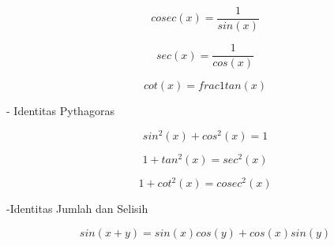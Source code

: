 \documentclass[a4paper,10pt]{article}
\begin{document}
\begin{eulernotebook}
\begin{eulercomment}
\begin{eulercomment}
\begin{eulercomment}
\begin{eulercomment}
\begin{eulercomment}
\begin{eulercomment}
\begin{eulercomment}
\begin{eulercomment}
\begin{eulercomment}
\begin{eulercomment}
\begin{eulercomment}
\begin{eulercomment}
\begin{eulercomment}
\begin{eulercomment}
\begin{eulercomment}
\begin{eulercomment}
\begin{eulercomment}
\begin{eulercomment}
\begin{eulercomment}
\begin{eulercomment}
\begin{eulercomment}
\begin{eulercomment}
\begin{eulercomment}
\begin{eulercomment}
\begin{eulercomment}
\begin{eulercomment}
\begin{eulercomment}
\begin{eulercomment}
\begin{eulercomment}
\begin{eulercomment}
\begin{eulercomment}
\begin{eulercomment}
\begin{eulercomment}
\begin{eulercomment}
\begin{eulercomment}
\begin{eulercomment}
\begin{eulercomment}
\begin{eulercomment}
\begin{eulercomment}
\begin{eulercomment}
\begin{eulercomment}
\begin{eulercomment}
\begin{eulercomment}
\begin{eulercomment}
\begin{eulercomment}
\begin{eulercomment}
\begin{eulercomment}
\begin{eulercomment}
\begin{eulerformula}
\[
cosec (x) =\frac {1}{sin (x)}
\]
\end{eulerformula}
\begin{eulerformula}
\[
sec (x)=\frac{1}{cos (x)}
\]
\end{eulerformula}
\begin{eulerformula}
\[
cot (x)=frac{1}{tan (x)}
\]
\end{eulerformula}
\begin{eulercomment}
- Identitas Pythagoras\\
\end{eulercomment}
\begin{eulerformula}
\[
sin^2 (x)+cos^2(x)=1
\]
\end{eulerformula}
\begin{eulerformula}
\[
1+tan^2(x)=sec^2(x)
\]
\end{eulerformula}
\begin{eulerformula}
\[
1+cot^2(x)=cosec^2(x)
\]
\end{eulerformula}
\begin{eulercomment}
-Identitas Jumlah dan Selisih\\
\end{eulercomment}
\begin{eulerformula}
\[
sin(x+y) = sin(x)cos(y) + cos(x)sin(y)
\]

\end{eulerformula}
\end{eulercomment}
\end{eulercomment}
\end{eulercomment}
\end{eulercomment}
\end{eulercomment}
\end{eulercomment}
\end{eulercomment}
\end{eulercomment}
\end{eulercomment}
\end{eulercomment}
\end{eulercomment}
\end{eulercomment}
\end{eulercomment}
\end{eulercomment}
\end{eulercomment}
\end{eulercomment}
\end{eulercomment}
\end{eulercomment}
\end{eulercomment}
\end{eulercomment}
\end{eulercomment}
\end{eulercomment}
\end{eulercomment}
\end{eulercomment}
\end{eulercomment}
\end{eulercomment}
\end{eulercomment}
\end{eulercomment}
\end{eulercomment}
\end{eulercomment}
\end{eulercomment}
\end{eulercomment}
\end{eulercomment}
\end{eulercomment}
\end{eulercomment}
\end{eulercomment}
\end{eulercomment}
\end{eulercomment}
\end{eulercomment}
\end{eulercomment}
\end{eulercomment}
\end{eulercomment}
\end{eulercomment}
\end{eulercomment}
\end{eulercomment}
\end{eulercomment}
\end{eulercomment}
\end{eulercomment}
\end{eulernotebook}
\end{document}
